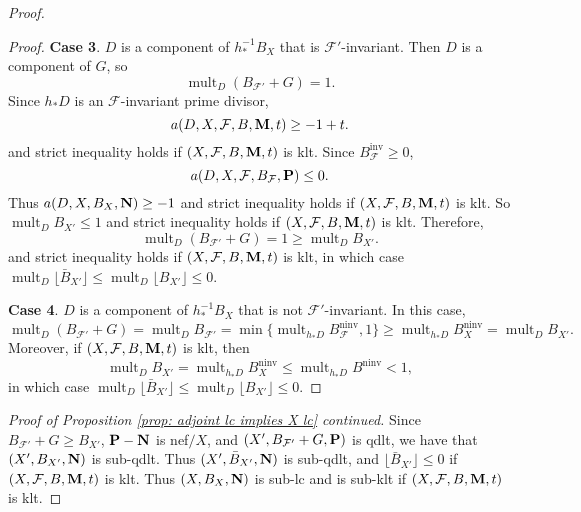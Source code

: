\documentclass[12pt]{amsart}
\numberwithin{equation}{section}
\newcommand{\Mm}{{\bf{M}}}
\newcommand{\Nn}{{\bf{N}}}
\newcommand{\Pp}{{\bf{P}}}
\newcommand{\ninv}{\operatorname{ninv}}
\newcommand{\inv}{\operatorname{inv}}
\newcommand{\mult}{\operatorname{mult}}
\newcommand{\Ff}{\mathcal{F}}
\theoremstyle{definition}
\theoremstyle{definition}
\theoremstyle{definition}
\begin{document}
\begin{proof}
\begin{proof}
\medskip

\noindent\textbf{Case 3}. $D$ is a component of $h^{-1}_*B_X$ that is $\Ff'$-invariant. Then $D$ is a component of $G$, so
$$\mult_D(B_{\Ff'}+G)=1.$$
Since $h_*D$ is an $\Ff$-invariant prime divisor,
$$a(D,X,\Ff,B,\Mm,t)\geq -1+t.$$
and strict inequality holds if $(X,\Ff,B,\Mm,t)$ is klt. Since $B_{\Ff}^{\inv}\geq 0$,
$$a(D,X,\Ff,B_{\Ff},\Pp)\leq 0.$$
Thus $a(D,X,B_X,\Nn)\geq -1$ and strict inequality holds if $(X,\Ff,B,\Mm,t)$ is klt. So $\mult_DB_{X'}\leq 1$ and strict inequality holds if $(X,\Ff,B,\Mm,t)$ is klt. Therefore,
$$\mult_D(B_{\Ff'}+G)=1\geq\mult_DB_{X'}.$$
and strict inequality holds if $(X,\Ff,B,\Mm,t)$ is klt, in which case $\mult_D\lfloor \bar B_{X'}\rfloor\leq \mult_D\lfloor B_{X'}\rfloor\leq0$.

\medskip

\noindent\textbf{Case 4}. $D$ is a component of $h^{-1}_*B_X$ that is not $\Ff'$-invariant. In this case, 
$$\mult_D(B_{\Ff'}+G)=\mult_DB_{\Ff'}=\min\{\mult_{h_*D}B_{\Ff}^{\ninv},1\}\geq\mult_{h_*D}B_X^{\ninv}=\mult_DB_{X'}.$$
Moreover, if $(X,\Ff,B,\Mm,t)$ is klt, then 
$$\mult_DB_{X'}=\mult_{h_*D}B_{X}^{\ninv}\leq\mult_{h_*D}B^{\ninv}<1,$$
 in which case $\mult_D\lfloor \bar B_{X'}\rfloor\leq \mult_D\lfloor B_{X'}\rfloor\leq0$.
\end{proof}

\noindent\textit{Proof of Proposition \ref{prop: adjoint lc implies X lc} continued.} Since $B_{\Ff'}+G\geq B_{X'}$, $\Pp-\Nn$ is nef$/X$, and $(X',B_{\Ff'}+G,\Pp)$ is qdlt, we have that $(X',B_{X'},\Nn)$ is sub-qdlt. Thus $(X',\bar B_{X'},\Nn)$ is sub-qdlt, and $\lfloor \bar B_{X'}\rfloor\leq 0$ if $(X,\Ff,B,\Mm,t)$ is klt. Thus $(X,B_X,\Nn)$ is sub-lc and is sub-klt if $(X,\Ff,B,\Mm,t)$ is klt.
\end{proof}
\end{document}
